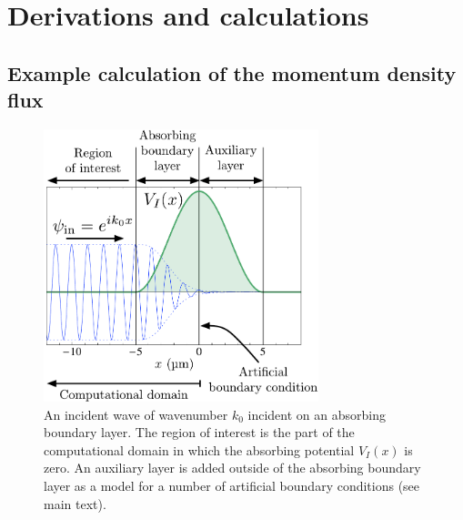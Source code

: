 \chapter{Derivations and calculations}
\label{MethodsAppendix}
\graphicspath{{Figures/MethodsAppendix/}{Figures/Common/}}



\section{Example calculation of the momentum density flux}
\label{MethodsAppendix:MomentumDensityFluxExampleCalculation}

\begin{figure}
    \centering
    \includegraphics[width=8cm]{AbsorbingBoundaryLayerScattering}
    \caption{\label{MethodsAppendix:AbsorbingBoundaryLayerScattering} An incident wave of wavenumber $k_0$ incident on an absorbing boundary layer. The region of interest is the part of the computational domain in which the absorbing potential $V_I(x)$ is zero. An auxiliary layer is added outside of the absorbing boundary layer as a model for a number of artificial boundary conditions (see main text).}
\end{figure}

